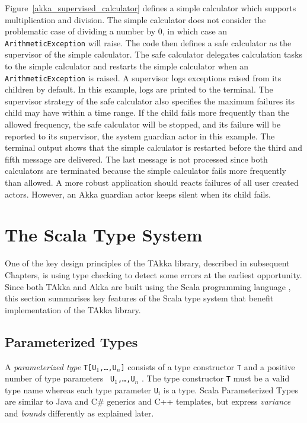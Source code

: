 Figure~\ref{akka_supervised_calculator} defines a simple calculator which 
supports multiplication and division. The simple calculator does not consider 
the problematic case of dividing a number by 0, in which case an 
{\tt ArithmeticException} will raise. The code then defines a safe calculator 
as the supervisor of the simple calculator. The safe calculator delegates
calculation tasks to the simple calculator and restarts the simple calculator 
when an {\tt ArithmeticException} is raised.  A supervisor logs exceptions 
raised from its children by default.  In this example, logs are printed to the 
terminal.  The supervisor strategy of the 
safe calculator also specifies the maximum failures its child may have
within a time range. If the child fails more frequently than the allowed 
frequency, the safe calculator will be stopped, and its failure will be 
reported to its supervisor, the system guardian actor in this example.
The terminal output shows that the simple calculator is restarted before the 
third and fifth message are delivered. The last message is not processed since
both calculators are terminated because the simple calculator fails more 
frequently than allowed.  A more robust application should reacts failures
of all user created actors.  However, an Akka guardian actor keeps silent
when its child fails.



\section{The Scala Type System}
\label{type_checking}

One of the key design principles of the TAkka library, described in 
subsequent Chapters, is using type checking to detect some errors at the 
earliest opportunity.  Since both TAkka and Akka are built using the Scala 
programming language \citep{scala_lan, scala_specification}, this section 
summarises key features of the Scala type system that benefit implementation 
of the TAkka library.  


\subsection{Parameterized Types}
\label{scala_parameterized_type}
A {\it parameterized type} {\tt T[U$_1$,\dots,U$_n$]} consists of a type 
constructor {\tt T} and a positive number of type parameters {\tt 
U$_1$,\dots,U$_n$} \citep{scala_specification}.  The type constructor {\tt T} 
must be a valid type name whereas each type parameter {\tt U$_i$} is a type.  Scala Parameterized Types are similar 
to Java and C\# generics and C++ templates, but express {\it variance} and {\it 
bounds} differently as explained later.

